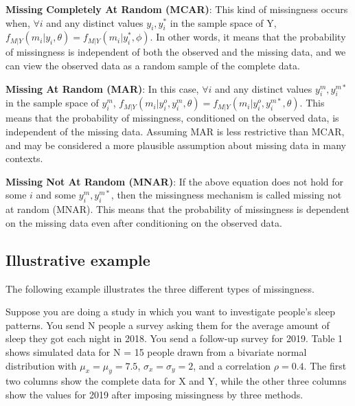 \documentclass{article}
\begin{document}
	\textbf{Missing Completely At Random (MCAR)}:
	This kind of missingness occurs when, $\forall i$ and any distinct values $y_{i}, y^{\ast}_{i}$ in the sample space of Y, $f_{M|Y}(m_{i}|y_{i}, \theta) = f_{M|Y}(m_{i}|y^{\ast}_{i}, \phi)$. In other words, it means that the probability of missingness is independent of both the observed and the missing data, and we can view the observed data as a random sample of the complete data.
	
	\textbf{Missing At Random (MAR)}:
	In this case, $\forall i$ and any distinct values $y^{m}_{i}, y^{m\ast}_{i}$ in the sample space of $y^{m}_{i}$, $f_{M|Y}(m_{i}|y^{o}_{i}, y^{m}_{i}, \theta) = f_{M|Y}(m_{i}|y^{o}_{i}, y^{m\ast}_{i}, \theta)$.
	This means that the probability of missingness, conditioned on the observed data, is independent of the missing data. Assuming MAR is less restrictive than MCAR, and may be considered a more plausible assumption about missing data in many contexts. 
	
	\textbf{Missing Not At Random (MNAR)}:
	If the above equation does not hold for some $i$ and some $y^{m}_{i}, y^{m\ast}_{i}$, then the missingness mechanism is called missing not at random (MNAR). This means that the probability of missingness is dependent on the missing data even after conditioning on the observed data.
	
	
	\subsection{Illustrative example}
	
	The following example illustrates the three different types of missingness.
	
	Suppose you are doing a study in which you want to investigate people's sleep patterns. You send N people a survey asking them for the average amount of sleep they got each night in 2018. You send a follow-up survey for 2019. Table 1 shows simulated data for N = 15 people drawn from a bivariate normal distribution with $\mu_{x} = \mu_{y} = 7.5$, $\sigma_{x} = \sigma_{y} = 2$, and a correlation $\rho = 0.4$. The first two columns show the complete data for X and Y, while the other three columns show the values for 2019 after imposing missingness by three methods.
	
\end{document}
